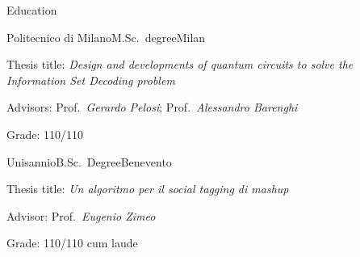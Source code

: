\documentclass[
	a4paper, %
	10pt, %
]{tresume} %
\begin{document}
\begin{tSection}{Education}
  \begin{tSubsection}{Politecnico di Milano}{}{M.Sc.\ degree}{Milan}
  \item Thesis title: \emph{Design and developments of quantum circuits to solve the Information Set Decoding problem}
  \item Advisors: Prof.\ \emph{Gerardo Pelosi}; Prof.\ \emph{Alessandro
      Barenghi}
  \item Grade: 110/110
  \end{tSubsection}
  \begin{tSubsection}{Unisannio}{}{B.Sc.\ Degree}{Benevento}
  \item Thesis title: \textit{Un algoritmo per il social tagging di mashup}
  \item Advisor: Prof.\ \emph{Eugenio Zimeo}
  \item Grade: 110/110 cum laude
  \end{tSubsection}
\end{tSection}
\end{document}
